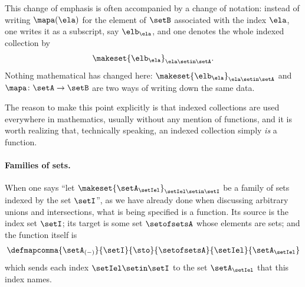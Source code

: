 This change of emphasis is often accompanied by a change of notation: instead of writing $\mapa(\ela)$ for the element of $\setB$ associated with the index $\ela$, one writes it as a subscript, say $\elb_\ela$, and one denotes the whole indexed collection by
\begin{equation}
\makeset{ \elb_\ela }_{\ela \setin \setA}.
\end{equation}
Nothing mathematical has changed here: $\makeset{ \elb_\ela }_{\ela \setin \setA}$ and $\mapa \colon \setA \to \setB$ are two ways of writing down the same data.

The reason to make this point explicitly is that indexed collections are used everywhere in mathematics, usually without any mention of functions, and it is worth realizing that, technically speaking, an indexed collection simply \emph{is} a function.

\paragraph{Families of sets.}
When one says ``let $\makeset{ \setA_\setIel }_{\setIel \setin \setI}$ be a family of sets indexed by the set $\setI$'', as we have already done when discussing arbitrary unions and intersections, what is being specified is a function. Its source is the index set $\setI$; its target is some set $\setofsetsA$ whose elements are sets; and the function itself is
\begin{equation}
\defmapcomma{
    \setA_{(-)}
}{
    \setI
}{
    \sto
}{
    \setofsetsA
}{
    \setIel
}{
    \setA_\setIel
}
\end{equation}
which sends each index $\setIel \setin \setI$ to the set $\setA_\setIel$ that this index names.



